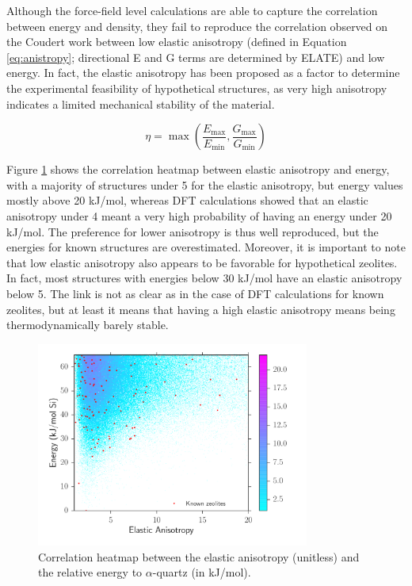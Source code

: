 \documentclass[journal=jacsat,manuscript=article]{achemso}
\newcommand\e[1]{\ensuremath{_{\text{#1}}}}
\begin{document}
Although the force-field level calculations are able to capture the correlation between energy and density, they fail to reproduce the correlation observed on the Coudert work\cite{Coudert2013} between low elastic anisotropy (defined in Equation \ref{eq:anistropy}; directional E and G terms are determined by ELATE) and low energy. In fact, the elastic anisotropy has been proposed as a factor to determine the experimental feasibility of hypothetical structures, as very high anisotropy indicates a limited mechanical stability of the material.\cite{Coudert2013}

\begin{equation}
  \eta = \max \left( \frac{E\e{max}}{E\e{min}}, \frac{G\e{max}}{G\e{min}} \right)
\label{eq:anistropy}
\end{equation}

Figure \ref{corr_En_An} shows the correlation heatmap between elastic anisotropy and energy, with a majority of structures under 5 for the elastic anisotropy, but energy values mostly above 20 kJ/mol, whereas DFT calculations showed that an elastic anisotropy under 4 meant a very high probability of having an energy under 20 kJ/mol.\cite{Coudert2013} The preference for lower anisotropy is thus well reproduced, but the energies for known structures are overestimated. Moreover, it is important to note that low elastic anisotropy also appears to be favorable for hypothetical zeolites. In fact, most structures with energies below 30 kJ/mol have an elastic anisotropy below 5. The link is not as clear as in the case of DFT calculations for known zeolites,\cite{Coudert2013} but at least it means that having a high elastic anisotropy means being thermodynamically barely stable.

\begin{figure}[ht!]\centering
\includegraphics[clip,trim=0cm 0cm 0cm 0.8cm,width=0.8\textwidth]{deem_database_18}
\caption{Correlation heatmap between the elastic anisotropy (unitless) and the relative energy to $\alpha$-quartz (in kJ/mol).
\label{corr_En_An}}
\end{figure}
		
\end{document}
